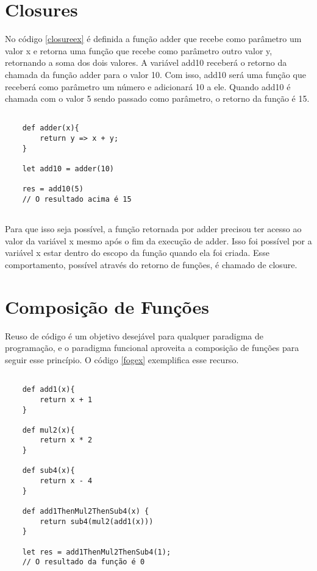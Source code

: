 \section{Closures}

No código \ref{closureex} é definida a função adder que 
recebe como parâmetro um valor x e retorna uma função 
que recebe como parâmetro outro valor y, retornando a 
soma dos dois valores. A variável add10 receberá 
o retorno da chamada da função adder para o valor 10. 
Com isso, add10 será uma função que receberá como 
parâmetro um número e adicionará 10 a ele. Quando 
add10 é chamada com o valor 5 sendo passado como 
parâmetro, o retorno da função é 15.

\begin{lstlisting}[caption={Exemplo de Closure},label=closureex]

    def adder(x){
        return y => x + y;
    }

    let add10 = adder(10)

    res = add10(5)
    // O resultado acima é 15


\end{lstlisting}

Para que isso seja possível, a função retornada por 
adder precisou ter acesso ao valor da variável x mesmo 
após o fim da execução de adder. Isso foi possível 
por a variável x estar dentro do escopo da função 
quando ela foi criada. Esse comportamento, 
possível através do retorno de funções, 
é chamado de closure\cite{mflambdas}.


\section{Composição de Funções}

Reuso de código é um objetivo desejável para qualquer 
paradigma de programação, e o paradigma funcional 
aproveita a composição de funções para seguir esse 
princípio\cite{realworldhaskell}.
O código \ref{fogex} exemplifica esse recurso.

\begin{lstlisting}[caption={Exemplo de Composição de Funções},label=fogex]

    def add1(x){
        return x + 1
    }

    def mul2(x){
        return x * 2
    }

    def sub4(x){
        return x - 4
    }

    def add1ThenMul2ThenSub4(x) {
        return sub4(mul2(add1(x)))
    }

    let res = add1ThenMul2ThenSub4(1);
    // O resultado da função é 0

\end{lstlisting}

